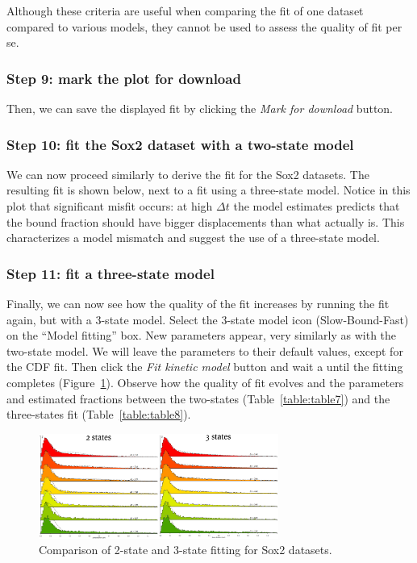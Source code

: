 Although these criteria are useful when comparing the fit of one dataset compared to various models, they cannot be used to assess the quality of fit per se.

\subsubsection{Step 9: mark the plot for download}
Then, we can save the displayed fit by clicking the \textit{Mark for download} button.

\subsubsection{Step 10: fit the Sox2 dataset with a two-state model}
We can now proceed similarly to derive the fit for the Sox2 datasets. The resulting fit is shown below, next to a fit using a three-state model. Notice in this plot that significant misfit occurs: at high \(\Delta t\) the model estimates predicts that the bound fraction should have bigger displacements than what actually is. This characterizes a model mismatch and suggest the use of a three-state model.

\subsubsection{Step 11: fit a three-state model}
Finally, we can now see how the quality of the fit increases by running the fit again, but with a 3-state model. Select the 3-state model icon (Slow-Bound-Fast) on the ``Model fitting'' box. New parameters appear, very similarly as with the two-state model. We will leave the parameters to their default values, except for the CDF fit. Then click the \textit{Fit kinetic model} button and wait a until the fitting completes (Figure~\ref{fig:tuto13}). Observe how the quality of fit evolves and the parameters and estimated fractions between the two-states (Table~\ref{table:table7}) and the three-states fit (Table~\ref{table:table8}).

\begin{figure}[H]
\centering
\includegraphics[width=0.7\textwidth]{../SPTGUI/static/SPTGUI/img/tutorial/0.7/tuto13.png}
\caption{\label{fig:tuto13}Comparison of 2-state and 3-state fitting for Sox2 datasets.}
\end{figure}

